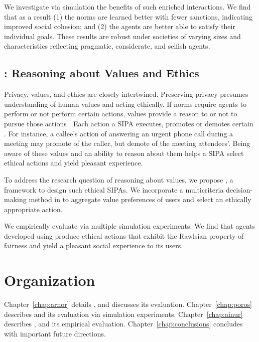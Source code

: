 We investigate via simulation the benefits
of such enriched interactions. We find
that as a result (1) the norms are learned better with
fewer sanctions, indicating improved social cohesion;
and (2) the agents are better able to satisfy
their individual goals. These results are robust under
societies of varying sizes and characteristics reflecting
pragmatic, considerate, and selfish agents.



\subsection[Reasoning about Values and Ethics]{\frameworkAinur: Reasoning about Values and Ethics}
Privacy, values, and ethics are closely intertwined. 
Preserving privacy presumes understanding of human values 
and acting ethically. 
% 
If norms require agents to perform or not perform certain actions,
values provide a reason to or not to pursue those actions
\citep{Dechesne-AIL13-Norms+Values}. Each action a \frameworkB SIPA
executes, promotes or demotes certain .
For instance, a callee's action of
answering an urgent phone call during a meeting may promote 
of the caller, but demote  of the meeting attendees'. 
Being aware of these values and an ability to reason about them 
helps a SIPA select ethical actions and yield pleasant experience.

To address the research question of reasoning about values, we 
propose \frameworkAinur, a framework to design such ethical 
SIPAs. We incorporate a multicriteria decision-making method 
in \frameworkAinur to aggregate value preferences of users and 
select an ethically appropriate action. 

 
We empirically evaluate \frameworkAinur via multiple simulation 
experiments. We find that agents developed using \frameworkAinur produce ethical actions that exhibit the
Rawlsian property of fairness and yield a pleasant social experience to its users.

\section{Organization}
Chapter~\ref{chap:arnor} details \frameworkA, and discusses its evaluation. 
Chapter~\ref{chap:poros} describes \frameworkB and its 
evaluation via simulation experiments. 
Chapter~\ref{chap:ainur} describes \frameworkAinur, and its empirical evaluation.  
Chapter~\ref{chap:conclusions} concludes with important future directions.